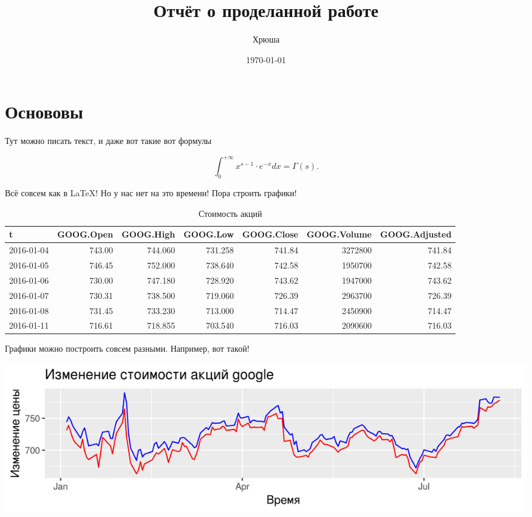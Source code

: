 \documentclass[a4paper]{article}\usepackage[]{graphicx}\usepackage[]{color}
\title{Отчёт о проделанной работе}
\author{Хрюша}
\date{\today}
\makeatletter
\def\maxwidth{ %
  \ifdim\Gin@nat@width>\linewidth
    \linewidth
  \else
    \Gin@nat@width
  \fi
}
\newenvironment{knitrout}{}{} %
\makeatother
\begin{document}
\maketitle

\section{Основовы}




Тут можно писать текст, и даже вот такие вот формулы

\[ \int_{0}^{+\infty} x^{s-1} \cdot e^{-x} dx = \Gamma(s). \]

Всё совсем как в \LaTeX! Но у нас нет на это времени! Пора строить графики!



\begin{table}[h!]

\begin{tabular}{l|r|r|r|r|r|r}
\hline
t & GOOG.Open & GOOG.High & GOOG.Low & GOOG.Close & GOOG.Volume & GOOG.Adjusted\\
\hline
2016-01-04 & 743.00 & 744.060 & 731.258 & 741.84 & 3272800 & 741.84\\
\hline
2016-01-05 & 746.45 & 752.000 & 738.640 & 742.58 & 1950700 & 742.58\\
\hline
2016-01-06 & 730.00 & 747.180 & 728.920 & 743.62 & 1947000 & 743.62\\
\hline
2016-01-07 & 730.31 & 738.500 & 719.060 & 726.39 & 2963700 & 726.39\\
\hline
2016-01-08 & 731.45 & 733.230 & 713.000 & 714.47 & 2450900 & 714.47\\
\hline
2016-01-11 & 716.61 & 718.855 & 703.540 & 716.03 & 2090600 & 716.03\\
\hline
\end{tabular}


\caption{Стоимость акций}
\end{table}


Графики можно построить совсем разными. Например, вот такой! 


\begin{knitrout}
\color{fgcolor}

{\centering \includegraphics[width=\maxwidth]{figure/unnamed-chunk-3-1} 

}



\end{knitrout}
\end{document}
